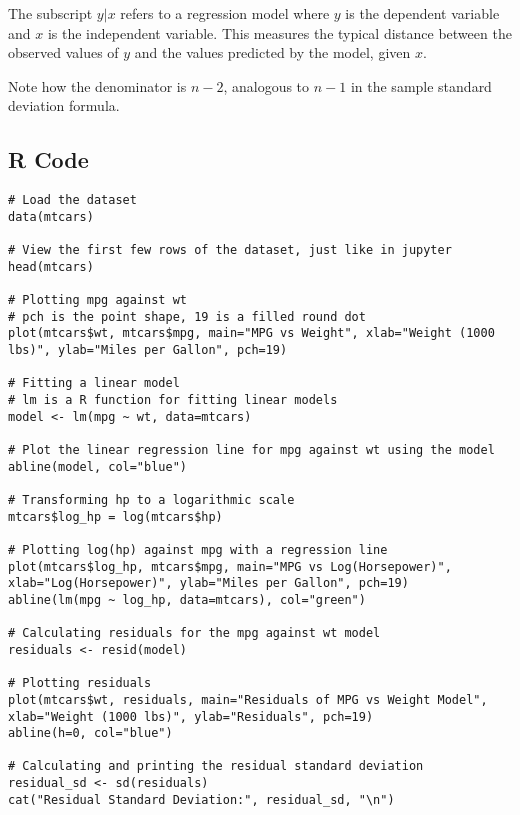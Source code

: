 \documentclass{article}
\begin{document}
The subscript $y|x$ refers to a regression model where $y$ is the dependent variable and $x$ is the independent variable. This measures the typical distance between the observed values of $y$ and the values predicted by the model, given $x$.

Note how the denominator is $n-2$, analogous to $n-1$ in the sample standard deviation formula.

\pagebreak

\subsection{R Code}

\begin{lstlisting}
# Load the dataset
data(mtcars)

# View the first few rows of the dataset, just like in jupyter
head(mtcars)

# Plotting mpg against wt
# pch is the point shape, 19 is a filled round dot
plot(mtcars$wt, mtcars$mpg, main="MPG vs Weight", xlab="Weight (1000 lbs)", ylab="Miles per Gallon", pch=19)

# Fitting a linear model
# lm is a R function for fitting linear models
model <- lm(mpg ~ wt, data=mtcars)

# Plot the linear regression line for mpg against wt using the model
abline(model, col="blue")

# Transforming hp to a logarithmic scale
mtcars$log_hp = log(mtcars$hp)

# Plotting log(hp) against mpg with a regression line
plot(mtcars$log_hp, mtcars$mpg, main="MPG vs Log(Horsepower)", xlab="Log(Horsepower)", ylab="Miles per Gallon", pch=19)
abline(lm(mpg ~ log_hp, data=mtcars), col="green")

# Calculating residuals for the mpg against wt model
residuals <- resid(model)

# Plotting residuals
plot(mtcars$wt, residuals, main="Residuals of MPG vs Weight Model", xlab="Weight (1000 lbs)", ylab="Residuals", pch=19)
abline(h=0, col="blue")

# Calculating and printing the residual standard deviation
residual_sd <- sd(residuals)
cat("Residual Standard Deviation:", residual_sd, "\n")
\end{lstlisting}
\end{document}
